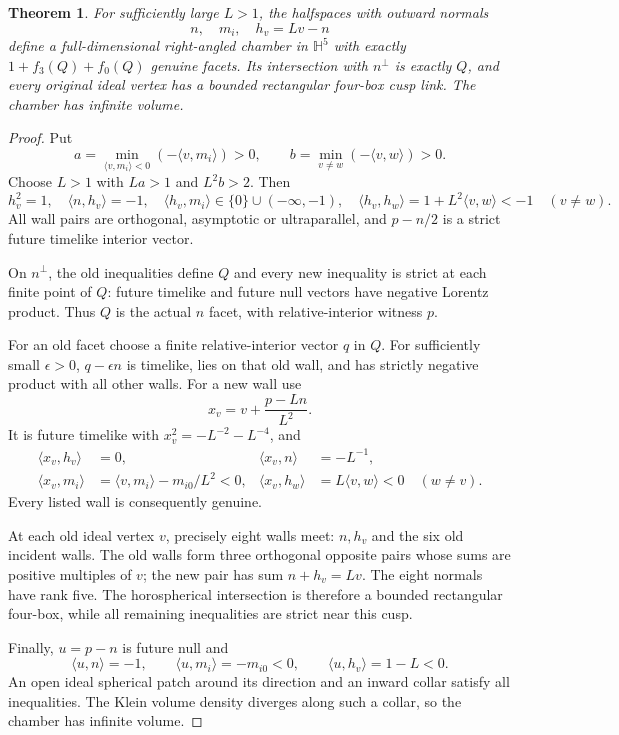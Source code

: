\documentclass[11pt]{article}
\newtheorem{theorem}{Theorem}
\newcommand{\ip}[2]{\langle #1,#2\rangle}
\begin{document}
\begin{theorem}
For sufficiently large $L>1$, the halfspaces with outward normals
\[
 n,\quad m_i,\quad h_v=Lv-n
\]
define a full-dimensional right-angled chamber in $\mathbb H^5$ with
exactly $1+f_3(Q)+f_0(Q)$ genuine facets. Its intersection with $n^\perp$
is exactly $Q$, and every original ideal vertex has a bounded rectangular
four-box cusp link. The chamber has infinite volume.
\end{theorem}
\begin{proof}
Put
\[
 a=\min_{\ip{v}{m_i}<0}(-\ip{v}{m_i})>0,
 \qquad b=\min_{v\ne w}(-\ip{v}{w})>0.
\]
Choose $L>1$ with $La>1$ and $L^2b>2$. Then
\[
 h_v^2=1,\quad \ip{n}{h_v}=-1,\quad
 \ip{h_v}{m_i}\in\{0\}\cup(-\infty,-1),\quad
 \ip{h_v}{h_w}=1+L^2\ip{v}{w}<-1\quad(v\ne w).
\]
All wall pairs are orthogonal, asymptotic or ultraparallel, and
$p-n/2$ is a strict future timelike interior vector.

On $n^\perp$, the old inequalities define $Q$ and every new inequality is
strict at each finite point of $Q$: future timelike and future null
vectors have negative Lorentz product. Thus $Q$ is the actual $n$ facet,
with relative-interior witness $p$.

For an old facet choose a finite relative-interior vector $q$ in $Q$.
For sufficiently small $\epsilon>0$, $q-\epsilon n$ is timelike, lies on
that old wall, and has strictly negative product with all other walls.
For a new wall use
\[
 x_v=v+\frac{p-Ln}{L^2}.
\]
It is future timelike with $x_v^2=-L^{-2}-L^{-4}$, and
\[
 \begin{aligned}
 \ip{x_v}{h_v}&=0,& \ip{x_v}{n}&=-L^{-1},\\
 \ip{x_v}{m_i}&=\ip{v}{m_i}-m_{i0}/L^2<0,&
 \ip{x_v}{h_w}&=L\ip{v}{w}<0\quad(w\ne v).
 \end{aligned}
\]
Every listed wall is consequently genuine.

At each old ideal vertex $v$, precisely eight walls meet: $n,h_v$ and
the six old incident walls. The old walls form three orthogonal opposite
pairs whose sums are positive multiples of $v$; the new pair has sum
$n+h_v=Lv$. The eight normals have rank five. The horospherical
intersection is therefore a bounded rectangular four-box, while all
remaining inequalities are strict near this cusp.

Finally, $u=p-n$ is future null and
\[
 \ip{u}{n}=-1,\qquad \ip{u}{m_i}=-m_{i0}<0,
 \qquad \ip{u}{h_v}=1-L<0.
\]
An open ideal spherical patch around its direction and an inward collar
satisfy all inequalities. The Klein volume density diverges along such
a collar, so the chamber has infinite volume.
\end{proof}
\end{document}
